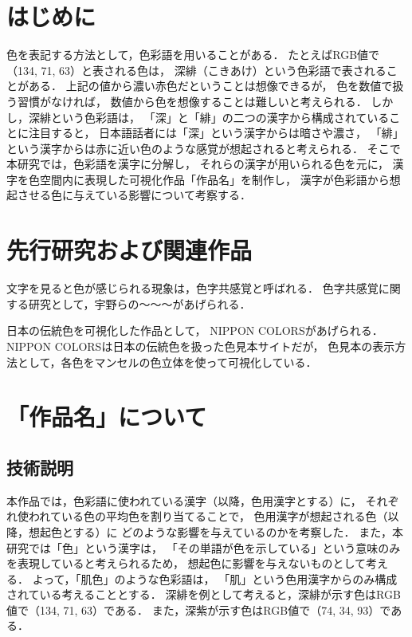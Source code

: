 \documentclass[a4j,twocolumn]{ujarticle} %
\newcommand{\visualizationtitle}{「作品名」}
\newcommand{\colorname}{色彩語}
\newcommand{\colorkanji}{色用漢字}
\newcommand{\recallcolor}{想起色}
\begin{document}
\maketitle
\thispagestyle{myheadings}

\section{はじめに}

色を表記する方法として，\colorname{}を用いることがある．
たとえばRGB値で（134, 71, 63）と表される色は，
深緋（こきあけ）という\colorname{}で表されることがある．
上記の値から濃い赤色だということは想像できるが，
色を数値で扱う習慣がなければ，
数値から色を想像することは難しいと考えられる．
しかし，深緋という\colorname{}は，
「深」と「緋」の二つの漢字から構成されていることに注目すると，
日本語話者には「深」という漢字からは暗さや濃さ，
「緋」という漢字からは赤に近い色のような感覚が想起されると考えられる．
そこで本研究では，\colorname{}を漢字に分解し，
それらの漢字が用いられる色を元に，
漢字を色空間内に表現した可視化作品\visualizationtitle{}を制作し，
漢字が\colorname{}から想起させる色に与えている影響について考察する．

\section{先行研究および関連作品}

文字を見ると色が感じられる現象は，色字共感覚と呼ばれる．
色字共感覚に関する研究として，宇野ら\cite{Uno2018}の〜〜〜があげられる．

日本の伝統色を可視化した作品として，
NIPPON COLORS\cite{NipponColors}があげられる．
NIPPON COLORSは日本の伝統色を扱った色見本サイトだが，
色見本の表示方法として，各色をマンセルの色立体を使って可視化している．

\section{\visualizationtitle{}について}

\subsection{技術説明}

本作品では，\colorname{}に使われている漢字（以降，\colorkanji{}とする）に，
それぞれ使われている色の平均色を割り当てることで，
\colorkanji{}が想起される色（以降，\recallcolor{}とする）に
どのような影響を与えているのかを考察した．
また，本研究では「色」という漢字は，
「その単語が色を示している」という意味のみを表現していると考えられるため，
\recallcolor{}に影響を与えないものとして考える．
よって，「肌色」のような\colorname{}は，
「肌」という\colorkanji{}からのみ構成されている考えることとする．
深緋を例として考えると，深緋が示す色はRGB値で（134, 71, 63）である．
また，深紫が示す色はRGB値で（74, 34, 93）である．
\end{document}
